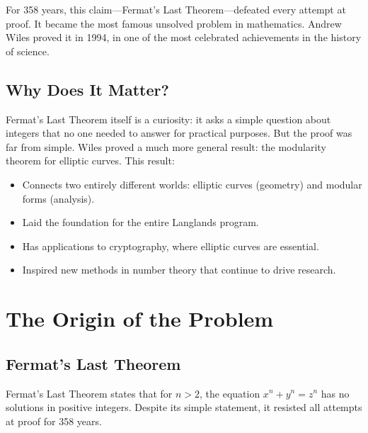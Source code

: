 For 358 years, this claim---Fermat's Last Theorem---defeated every attempt at proof. It became the most famous unsolved problem in mathematics. Andrew Wiles proved it in 1994, in one of the most celebrated achievements in the history of science.

\subsection{Why Does It Matter?}

Fermat's Last Theorem itself is a curiosity: it asks a simple question about integers that no one needed to answer for practical purposes. But the proof was far from simple. Wiles proved a much more general result: the modularity theorem for elliptic curves. This result:
\begin{itemize}
\item Connects two entirely different worlds: elliptic curves (geometry) and modular forms (analysis).
\item Laid the foundation for the entire Langlands program.
\item Has applications to cryptography, where elliptic curves are essential.
\item Inspired new methods in number theory that continue to drive research.
\end{itemize}

\section{The Origin of the Problem}

\subsection{Fermat's Last Theorem}

Fermat's Last Theorem states that for $n > 2$, the equation $x^n + y^n = z^n$ has no solutions in positive integers. Despite its simple statement, it resisted all attempts at proof for 358 years.

